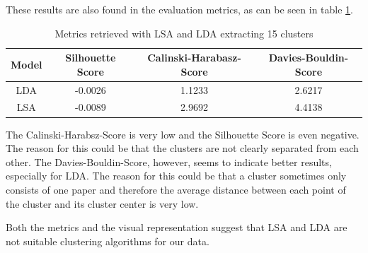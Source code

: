 These results are also found in the evaluation metrics, as can be seen in table \ref{tab:scores_lsa_lda}.
\begin{table}[]
    \centering
    \begin{tabular}{c|c|c|c}
     Model & Silhouette Score & Calinski-Harabasz-Score & Davies-Bouldin-Score  \\
     \hline
     \hline
     LDA & -0.0026 & 1.1233 & 2.6217 \\
     \hline
     LSA & -0.0089 & 2.9692 & 4.4138
    \end{tabular}
    \caption{Metrics retrieved with LSA and LDA extracting 15 clusters}
    \label{tab:scores_lsa_lda}
\end{table}
The Calinski-Harabsz-Score is very low and the Silhouette Score is even negative.
The reason for this could be that the clusters are not clearly separated from each other.
The Davies-Bouldin-Score, however, seems to indicate better results, especially for LDA.
The reason for this could be that a cluster sometimes only consists of one paper and therefore the average distance between each point of the cluster and its cluster center is very low.

Both the metrics and the visual representation suggest that LSA and LDA are not suitable clustering algorithms for our data.


